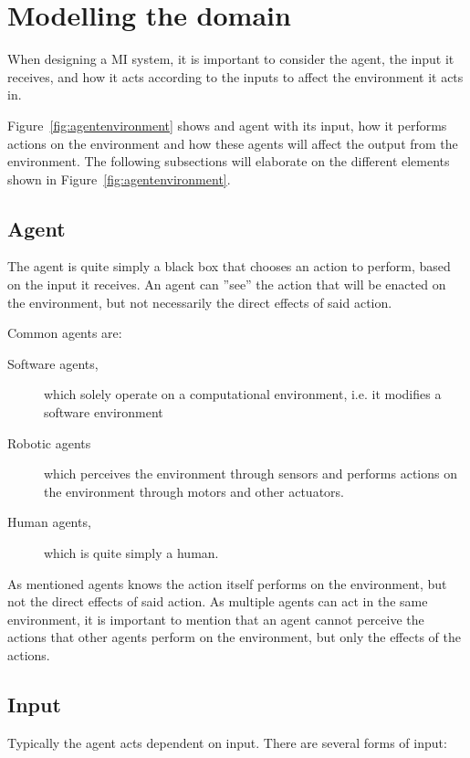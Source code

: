 \section{Modelling the domain}\label{Theory:MIModelling}
When designing a MI system, it is important to consider the agent, the input it receives, and how it acts according to the inputs to affect the environment it acts in.


Figure~\ref{fig:agentenvironment} shows and agent with its input, how it performs actions on the environment and how these agents will affect the output from the environment.
The following subsections will elaborate on the different elements shown in Figure~\ref{fig:agentenvironment}.
\subsection{Agent}
The agent is quite simply a black box that chooses an action to perform, based on the input it receives.
An agent can ''see'' the action that will be enacted on the environment, but not necessarily the direct effects of said action.

Common agents are: 
\begin{description}
    \item[Software agents,] which solely operate on a computational environment, i{.}e{.} it modifies a software environment
    \item[Robotic agents]which perceives the environment through sensors and performs actions on the environment through motors and other actuators.
    \item[Human agents,]which is quite simply a human. 
\end{description}
As mentioned agents knows the action itself performs on the environment, but not the direct effects of said action.
As multiple agents can act in the same environment, it is important to mention that an agent cannot perceive the actions that other agents perform on the environment, but only the effects of the actions.

\subsection{Input}
Typically the agent acts dependent on input.
There are several forms of input:

